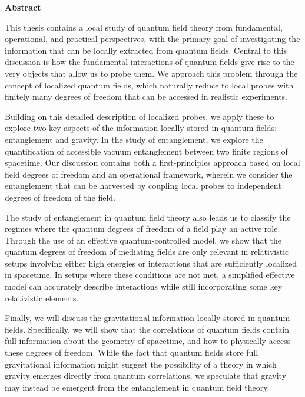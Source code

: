 \cleardoublepage
{}    %


\begin{center}\textbf{Abstract}\end{center}


This thesis contains a local study of quantum field theory from fundamental, operational, and practical perspectives, with the primary goal of investigating the information that can be locally extracted from quantum fields. Central to this discussion is how the fundamental interactions of quantum fields give rise to the very objects that allow us to probe them. We approach this problem through the concept of localized quantum fields, which naturally reduce to local probes with finitely many degrees of freedom that can be accessed in realistic experiments.

Building on this detailed description of localized probes, we apply these to explore two key aspects of the information locally stored in quantum fields: entanglement and gravity. In the study of entanglement, we explore the quantification of accessible vacuum entanglement between two finite regions of spacetime. Our discussion contains both a first-principles approach based on local field degrees of freedom and an operational framework, wherein we consider the entanglement that can be harvested by coupling local probes to independent degrees of freedom of the field.

The study of entanglement in quantum field theory also leads us to classify the regimes where the quantum degrees of freedom of a field play an active role. Through the use of an effective quantum-controlled model, we show that the quantum degrees of freedom of mediating fields are only relevant in relativistic setups involving either high energies or interactions that are sufficiently localized in spacetime. In setups where these conditions are not met, a simplified effective model can accurately describe interactions while still incorporating some key relativistic elements.

Finally, we will discuss the gravitational information locally stored in quantum fields. Specifically, we will show that the correlations of quantum fields contain full information about the geometry of spacetime, and how to physically access these degrees of freedom.  While the fact that quantum fields store full gravitational information might suggest the possibility of a theory in which gravity emerges directly from quantum correlations, we speculate that gravity may instead be emergent from the entanglement in quantum field theory.


